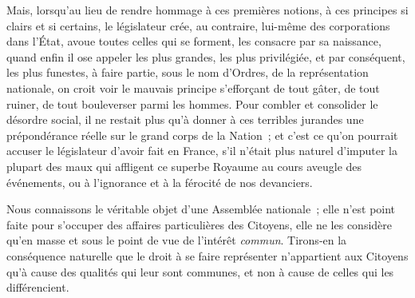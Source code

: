 \documentclass[french,twoside]{book} %
\begin{document}
Mais, lorsqu’au lieu de rendre hommage à ces premières notions, à ces principes si clairs et si certains, le législateur crée, au contraire, lui-même des corporations dans l’État, avoue toutes celles qui se forment, les consacre par sa naissance, quand enfin il ose appeler les plus grandes, les plus privilégiée, et par conséquent, les plus funestes, à faire partie, sous le nom d’Ordres, de la représentation nationale, on croit voir le mauvais principe s’efforçant de tout gâter, de tout ruiner, de tout bouleverser parmi les hommes. Pour combler et consolider le désordre social, il ne restait plus qu’à donner à ces terribles jurandes une prépondérance réelle sur le grand corps de la Nation ; et c’est ce qu’on pourrait accuser le législateur d’avoir fait en France, s’il n’était plus naturel d’imputer la plupart des maux qui affligent ce superbe Royaume au cours aveugle des événements, ou à l’ignorance et à la férocité de nos devanciers.\par
Nous connaissons le véritable objet d’une Assemblée nationale ; elle n’est point faite pour s’occuper des affaires particulières des Citoyens, elle ne les considère qu’en masse et sous le point de vue de l’intérêt {\itshape commun}. Tirons-en la conséquence naturelle que le droit à se faire représenter n’appartient aux Citoyens qu’à cause des qualités qui leur sont communes, et non à cause de celles qui les différencient.\par
\end{document}

